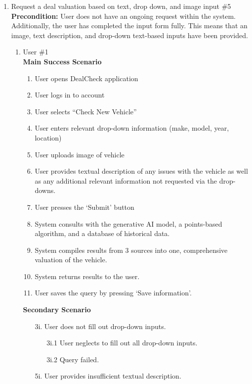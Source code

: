 \documentclass[]{article}
\begin{document}
\begin{enumerate}[{\bf {BE}1.}]
	\item Request a deal valuation based on text, drop down, and image input \#5 \\

	{\bf Precondition:} User does not have an ongoing request within the system. Additionally, 
	the user has completed the input form fully. This means that an image, 
	text description, and drop-down text-based inputs have been provided.
	\begin{enumerate}[{\bf VP1.}]
		\item User \#1 \\
		{\bf Main Success Scenario}
		\begin{enumerate}[1.]
			\item User opens DealCheck application
			\item User logs in to account
			\item User selects “Check New Vehicle”
			\item User enters relevant drop-down information (make, model, year, location)
			\item User uploads image of vehicle
			\item User provides textual description of any issues with the vehicle as well as any additional relevant information not requested via the drop-downs.
			\item User presses the ‘Submit’ button
			\item System consults with the generative AI model, a points-based algorithm, and a database of historical data.
			\item System compiles results from 3 sources into one, comprehensive valuation of the vehicle.
			\item System returns results to the user.
			\item User saves the query by pressing ‘Save information’.
		\end{enumerate}
		{\bf Secondary Scenario} \\
            \begin{enumerate}
                \item [3i.] User does not fill out drop-down inputs.
    		\begin{enumerate}
    			\item [3i.1] User neglects to fill out all drop-down inputs.
    			\item [3i.2] Query failed.
    		\end{enumerate}
    		\item [5i.] User provides insufficient textual description.

\end{enumerate}
\end{enumerate}
\end{enumerate}
\end{document}
